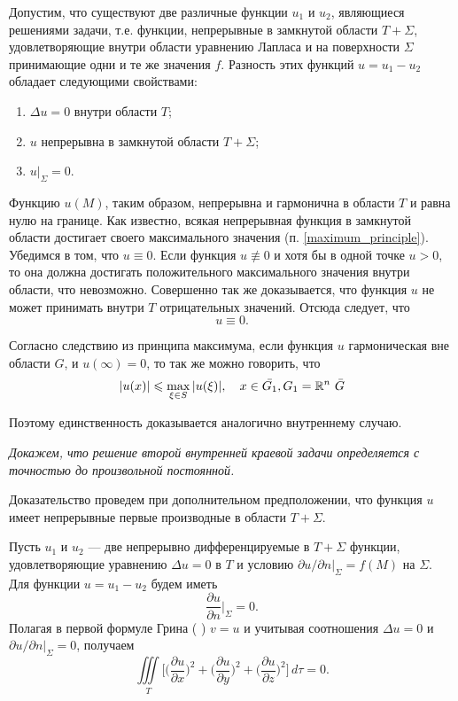 Допустим, что существуют две различные функции $u_1$ и $u_2$, являющиеся решениями задачи, т.е. функции, непрерывные в замкнутой области $T + \Sigma$, удовлетворяющие внутри области уравнению Лапласа и на поверхности $\Sigma$ принимающие одни и те же значения $f$. Разность этих функций $u = u_1 - u_2$ обладает следующими свойствами:
\begin{enumerate}
	\item $\Delta u = 0$ внутри области $T$;
	
	\item $u$ непрерывна в замкнутой области $T + \Sigma$;
	
	\item $u|_{\Sigma} = 0.$
\end{enumerate}

Функцию $u(M)$, таким образом, непрерывна и гармонична в области $T$ и равна нулю на границе. Как известно, всякая непрерывная функция в замкнутой области достигает своего максимального значения (п. \ref{maximum_principle}). Убедимся в том, что $u \equiv 0$. Если функция $u \not \equiv 0$ и хотя бы в одной точке $u > 0$, то она должна достигать положительного максимального значения внутри области, что невозможно. Совершенно так же доказывается, что функция $u$ не может принимать внутри $T$ отрицательных значений. Отсюда следует, что 
\begin{equation*}
	u \equiv 0.
\end{equation*}

Согласно следствию из принципа максимума, если функция $u$ гармоническая вне области $G$, и $u(\infty) = 0$, то так же можно говорить, что 
\begin{equation*}
	\abs{u(x)} \leqslant \max\limits_{\xi \in S}{\abs{u(\xi)}}, \quad x \in \bar{G_1}, G_1 = \mathbb{R}^n \ \bar{G}  
\end{equation*}

Поэтому единственность доказывается аналогично внутреннему случаю. 

\textit{Докажем, что решение второй внутренней краевой задачи определяется с точностью до произвольной постоянной.}

Доказательство проведем при дополнительном предположении, что функция $u$ имеет непрерывные первые производные в области $T + \Sigma$. 

Пусть $u_1$ и $u_2$ --- две непрерывно дифференцируемые в $T + \Sigma$ функции, удовлетворяющие уравнению $\Delta u = 0$ в $T$ и условию $\partial u/ \partial n |_{\Sigma} = f(M)$ на $\Sigma$. Для функции $u = u_1 - u_2$ будем иметь 
\begin{equation*}
	\frac{\partial u}{\partial n} \Big|_{\Sigma} = 0.
\end{equation*}
Полагая в первой формуле Грина (%
) $v = u$ и учитывая соотношения $\Delta u = 0$ и $\partial u / \partial n |_{\Sigma} = 0$, получаем 
\begin{equation*}
	 \iiint \limits_{T} \Bigg[\Bigg(\frac{\partial u}{\partial x}\Bigg)^2 + \Bigg(\frac{\partial u}{\partial y}\Bigg)^2 + \Bigg(\frac{\partial u}{\partial z}\Bigg)^2\Bigg] \, d\tau = 0.
\end{equation*}

